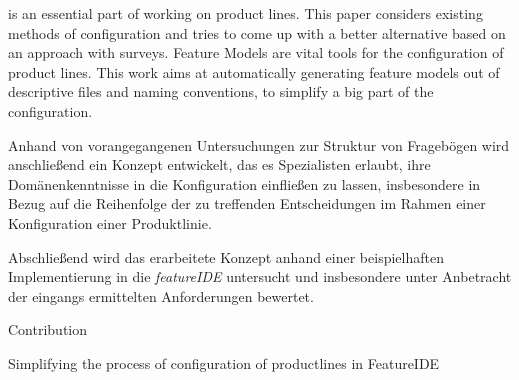 % 
% 
% 
% 
 is an essential part of working on product lines. This paper considers existing methods of configuration and tries to come up with a better alternative based on an approach with surveys.
Feature Models are vital tools for the configuration of product lines. This work aims at automatically generating feature models out of descriptive files and naming conventions, to simplify a big part of the configuration.


Anhand von vorangegangenen Untersuchungen zur Struktur von Frageb\"ogen wird anschlie\ss end ein Konzept entwickelt, das es Spezialisten erlaubt, ihre Dom\"anenkenntnisse in die Konfiguration einflie\ss en zu lassen, insbesondere in Bezug auf die Reihenfolge der zu treffenden Entscheidungen im Rahmen einer Konfiguration einer Produktlinie.

Abschlie\ss end wird das erarbeitete Konzept anhand einer beispielhaften Implementierung in die \textit{featureIDE} untersucht und insbesondere unter Anbetracht der eingangs ermittelten Anforderungen bewertet.

Contribution

Simplifying the process of configuration of productlines in FeatureIDE